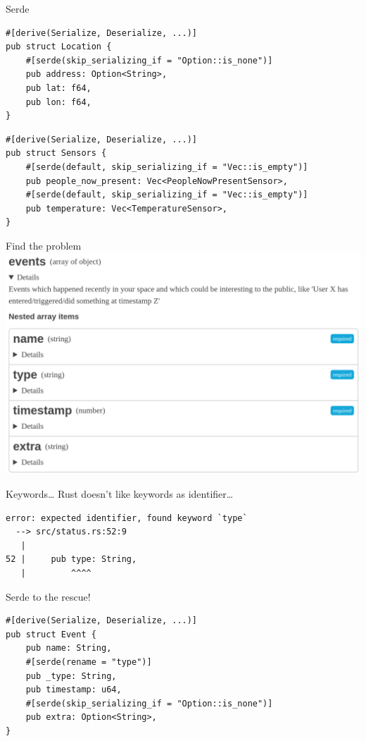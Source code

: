 \begin{frame}[fragile]{Serde}
    \begin{verbatim}
#[derive(Serialize, Deserialize, ...)]
pub struct Location {
    #[serde(skip_serializing_if = "Option::is_none")]
    pub address: Option<String>,
    pub lat: f64,
    pub lon: f64,
}
    \end{verbatim}
    \pause\begin{verbatim}
#[derive(Serialize, Deserialize, ...)]
pub struct Sensors {
    #[serde(default, skip_serializing_if = "Vec::is_empty")]
    pub people_now_present: Vec<PeopleNowPresentSensor>,
    #[serde(default, skip_serializing_if = "Vec::is_empty")]
    pub temperature: Vec<TemperatureSensor>,
}
    \end{verbatim}
\end{frame}

\begin{frame}[fragile]{Find the problem}
    \includegraphics[height=0.98\textheight]{./spaceapi_in_rust/events.png}
\end{frame}

\begin{frame}[c,fragile]{Keywords\ldots}
    Rust doesn't like keywords as identifier\ldots
    \begin{verbatim}
error: expected identifier, found keyword `type`
  --> src/status.rs:52:9
   |
52 |     pub type: String,
   |         ^^^^
    \end{verbatim}
\end{frame}

\begin{frame}[c,fragile]{Serde to the rescue!}
    \begin{verbatim}
#[derive(Serialize, Deserialize, ...)]
pub struct Event {
    pub name: String,
    #[serde(rename = "type")]
    pub _type: String,
    pub timestamp: u64,
    #[serde(skip_serializing_if = "Option::is_none")]
    pub extra: Option<String>,
}
    \end{verbatim}
\end{frame}

